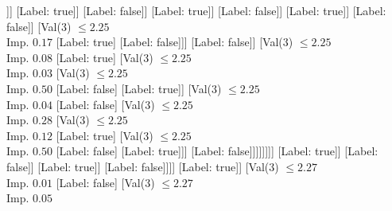 \documentclass[margin=10pt]{standalone}
\begin{document}
\begin{forest}
																										[Val($3$) $ \leq 2.24$ \\ Imp. $0.02$
																											[Val($3$) $ \leq 2.24$ \\ Imp. $0.12$
																												[Val($3$) $ \leq 2.24$ \\ Imp. $0.04$
																													[Val($3$) $ \leq 2.24$ \\ Imp. $0.25$
																														[Val($3$) $ \leq 2.24$ \\ Imp. $0.03$
																															[Label: false]
																															[Val($3$) $ \leq 2.24$ \\ Imp. $0.38$
																																[Label: true]
																																[Label: false]]]
																														[Label: true]]
																													[Label: false]]
																												[Label: true]]
																											[Label: false]]
																										[Label: true]]
																									[Label: false]]
																								[Val($3$) $ \leq 2.25$ \\ Imp. $0.17$
																									[Label: true]
																									[Label: false]]]
																							[Label: false]]
																						[Val($3$) $ \leq 2.25$ \\ Imp. $0.08$
																							[Label: true]
																							[Val($3$) $ \leq 2.25$ \\ Imp. $0.03$
																								[Val($3$) $ \leq 2.25$ \\ Imp. $0.50$
																									[Label: false]
																									[Label: true]]
																								[Val($3$) $ \leq 2.25$ \\ Imp. $0.04$
																									[Label: false]
																									[Val($3$) $ \leq 2.25$ \\ Imp. $0.28$
																										[Val($3$) $ \leq 2.25$ \\ Imp. $0.12$
																											[Label: true]
																											[Val($3$) $ \leq 2.25$ \\ Imp. $0.50$
																												[Label: false]
																												[Label: true]]]
																										[Label: false]]]]]]]]
																			[Label: true]]
																		[Label: false]]
																	[Label: true]]
																[Label: false]]]]
													[Label: true]]
												[Val($3$) $ \leq 2.27$ \\ Imp. $0.01$
													[Label: false]
													[Val($3$) $ \leq 2.27$ \\ Imp. $0.05$

\end{forest}
\end{document}
